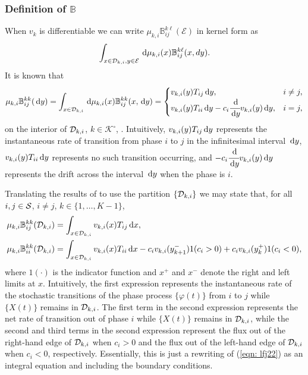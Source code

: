 \subsubsection{Definition of \(\mathbb B\)}
When \(v_k\) is differentiable we can write \(\mu_{k,i}\mathbb B_{ij}^{k\ell}(\mathcal{E})\) in kernel form as \[\displaystyle\int_{x\in\mathcal{D}_{k,i},y\in\mathcal{E}}\, \mathrm{d} \mu_{k,i}(x)\mathbb B_{ij}^{k\ell}(x,dy).\] It is known that
\begin{align}\label{eqn: lfj22}\mu_{k,i}\mathbb B_{ij}^{kk}(\, \mathrm{d} y)=\int_{x\in\mathcal{D}_{k,i}}\, \mathrm{d}\mu_{k,i}(x)\mathbb B_{ij}^{kk}(x,\, \mathrm{d} y)=\begin{cases}
v_{k,i}(y)T_{ij}\, \mathrm{d} y, & i\neq j,\\
v_{k,i}(y)T_{ii}\, \mathrm{d} y - c_i\cfrac{\, \mathrm{d}}{\, \mathrm{d} y}v_{k,i}(y)\, \mathrm{d} y, & i=j, 
\end{cases}\end{align}
on the interior of \(\mathcal{D}_{k,i}\), \(k\in\mathcal K^\circ\), \citep{kk1995}. Intuitively, \(v_{k,i}(y)T_{ij}\, \mathrm{d} y\) represents the instantaneous rate of transition from phase \(i\) to \(j\) in the infinitesimal interval \(\, \mathrm{d} y\), \(v_{k,i}(y)T_{ii}\, \mathrm{d} y\) represents no such transition occurring, and \(- c_i\cfrac{\, \mathrm{d}}{\, \mathrm{d} y}v_{k,i}(y)\, \mathrm{d} y\) represents the drift across the interval \(\, \mathrm{d} y\) when the phase is \(i\). 

Translating the results of \cite{bo2014} to use the partition \(\{\mathcal{D}_{k,i}\}\) we may state that, for all \(i,j\in\mathcal{S}\), \(i\neq j\), \(k\in\{1,\dots,K-1\}\),
\begin{align*}
	\mu_{k,i}\mathbb B_{ij}^{kk}(\mathcal{D}_{k,i})&=\int_{x\in\mathcal{D}_{k,i}}v_{k,i}(x)T_{ij}\, \mathrm{d} x,\\
	\mu_{k,i}\mathbb B_{ii}^{kk}(\mathcal{D}_{k,i})&=\int_{x\in\mathcal{D}_{k,i}}v_{k,i}(x)T_{ii}\, \mathrm{d} x - c_iv_{k,i}(y_{k+1}^-) 1{(c_i>0)} + c_iv_{k,i}(y_{k}^+) 1{(c_i<0)},
\end{align*}
where \( 1(\cdot)\) is the indicator function and \(x^+\) and \(x^-\) denote the right and left limits at \(x\). 
Intuitively, the first expression represents the instantaneous rate of the stochastic transitions of the phase process \(\{\varphi(t)\}\) from \(i\) to \(j\) while \(\{X(t)\}\) remains in \(\mathcal{D}_{k,i}\). The first term in the second expression represents the net rate of transition out of phase \(i\) while \(\{X(t)\}\) remains in \(\mathcal{D}_{k,i}\), while the second and third terms in the second expression represent the flux out of the right-hand edge of \(\mathcal{D}_{k,i}\) when \(c_i>0\) and the flux out of the left-hand edge of \(\mathcal{D}_{k,i}\) when \(c_i<0\), respectively. Essentially, this is just a rewriting of (\ref{eqn: lfj22}) as an integral equation and including the boundary conditions.

